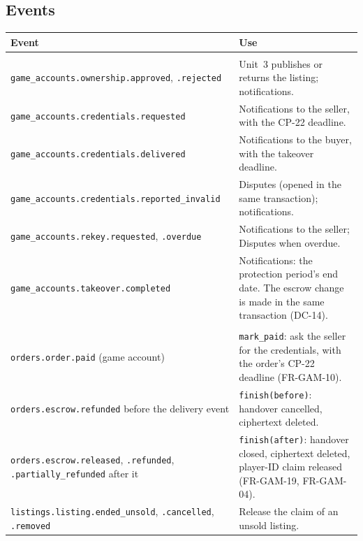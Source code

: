 \documentclass[11pt,a4paper]{article}
\newenvironment{dtable}[1]{\small\begin{longtable}{#1}}{\end{longtable}}
\begin{document}
\subsection{Events}
\begin{dtable}{@{}>{\raggedright\arraybackslash}p{6.4cm}>{\raggedright\arraybackslash}p{8.8cm}@{}}
\toprule
\textbf{Event} & \textbf{Use} \\ \midrule \endhead
\multicolumn{2}{@{}l}{\textit{Published (outbox, DC-6). No payload ever contains key material or ciphertext.}} \\
\texttt{game\_accounts.\allowbreak ownership.approved}, \texttt{.rejected} & Unit~3 publishes or returns the listing; notifications. \\
\texttt{game\_accounts.\allowbreak credentials.requested} & Notifications to the seller, with the CP-22 deadline. \\
\texttt{game\_accounts.\allowbreak credentials.delivered} & Notifications to the buyer, with the takeover deadline. \\
\texttt{game\_accounts.\allowbreak credentials.\allowbreak reported\_invalid} & Disputes (opened in the same transaction); notifications. \\
\texttt{game\_accounts.\allowbreak rekey.requested}, \texttt{.overdue} & Notifications to the seller; Disputes when overdue. \\
\texttt{game\_accounts.\allowbreak takeover.completed} & Notifications: the protection period's end date. The escrow change is made in the same transaction (DC-14). \\
\multicolumn{2}{@{}l}{\textit{Consumed (idempotent)}} \\
\texttt{orders.order.paid} (game account) & \texttt{mark\_paid}: ask the seller for the credentials, with the order's CP-22 deadline (FR-GAM-10). \\
\texttt{orders.escrow.refunded} before the delivery event & \texttt{finish(before)}: handover cancelled, ciphertext deleted. \\
\texttt{orders.escrow.released}, \texttt{.refunded}, \texttt{.partially\_refunded} after it & \texttt{finish(after)}: handover closed, ciphertext deleted, player-ID claim released (FR-GAM-19, FR-GAM-04). \\
\texttt{listings.listing.ended\_unsold}, \texttt{.cancelled}, \texttt{.removed} & Release the claim of an unsold listing. \\
\bottomrule
\end{dtable}
\end{document}
